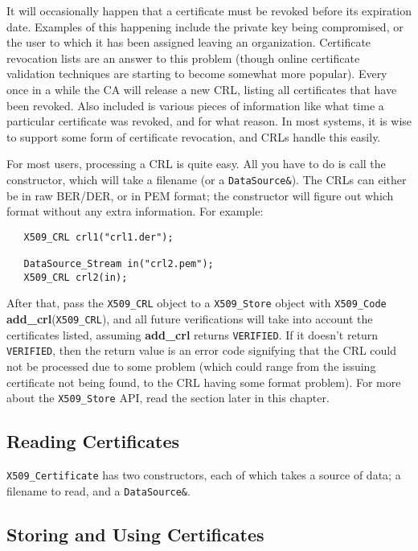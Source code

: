 \documentclass{article}
\newcommand{\function}[1]{\textbf{#1}}
\newcommand{\type}[1]{\texttt{#1}}
\begin{document}
It will occasionally happen that a certificate must be revoked before
its expiration date. Examples of this happening include the private
key being compromised, or the user to which it has been assigned
leaving an organization. Certificate revocation lists are an answer to
this problem (though online certificate validation techniques are
starting to become somewhat more popular). Every once in a while the
CA will release a new CRL, listing all certificates that have been
revoked. Also included is various pieces of information like what time
a particular certificate was revoked, and for what reason. In most
systems, it is wise to support some form of certificate revocation,
and CRLs handle this easily.

For most users, processing a CRL is quite easy. All you have to do is call the
constructor, which will take a filename (or a \type{DataSource\&}). The CRLs
can either be in raw BER/DER, or in PEM format; the constructor will figure out
which format without any extra information. For example:

\begin{verbatim}
   X509_CRL crl1("crl1.der");

   DataSource_Stream in("crl2.pem");
   X509_CRL crl2(in);
\end{verbatim}

After that, pass the \type{X509\_CRL} object to a \type{X509\_Store} object
with \type{X509\_Code} \function{add\_crl}(\type{X509\_CRL}), and all future
verifications will take into account the certificates listed, assuming
\function{add\_crl} returns \type{VERIFIED}. If it doesn't return
\type{VERIFIED}, then the return value is an error code signifying that the CRL
could not be processed due to some problem (which could range from the issuing
certificate not being found, to the CRL having some format problem). For more
about the \type{X509\_Store} API, read the section later in this chapter.

\subsection{Reading Certificates}

\type{X509\_Certificate} has two constructors, each of which takes a source of
data; a filename to read, and a \type{DataSource\&}.

\subsection{Storing and Using Certificates}
\end{document}
